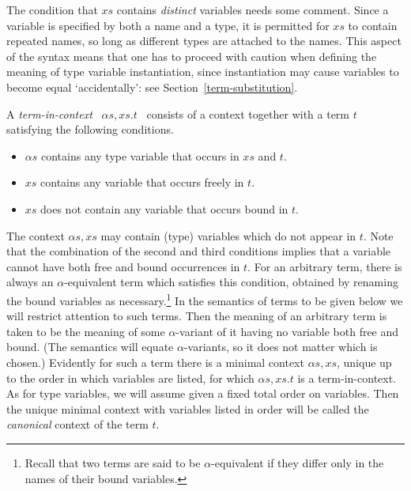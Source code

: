 The condition that $x\!s$ contains {\em distinct\/} variables needs
some comment. Since a variable is specified by both a name and a
type,  it is permitted for $x\!s$ to contain repeated
names,
 so long as different types are attached to the
names. This aspect of the syntax means that one has to proceed with
caution when defining the meaning of type variable instantiation,
since instantiation may cause variables to become equal
`accidentally': see Section~\ref{term-substitution}.

A {\em term-in-context\/}
$\:\;\alpha\!s,\!x\!s.t\;\:$ consists of a context together with a term
$t$ satisfying the following conditions.
\begin{itemize}

\item $\alpha\!s$ contains any type variable that occurs in $x\!s$ and $t$.

\item $x\!s$ contains any variable that occurs freely in $t$.

\item $x\!s$ does not contain any variable that occurs
bound in $t$.

\end{itemize}
The context $\alpha\!s,\!x\!s$ may contain (type) variables which do
not appear in $t$.  Note that the combination of the second and third
conditions implies that a variable cannot have both free and bound
occurrences in $t$. For an arbitrary term, there is always an
$\alpha$-equivalent term which satisfies this condition, obtained by
renaming the bound variables as necessary.\footnote{Recall that two
terms are said to be $\alpha$-equivalent if they differ only in the
names of their bound variables.} In the semantics of terms to be given
below we will restrict attention to such terms. Then the meaning of an
arbitrary term is taken to be the meaning of some $\alpha$-variant of
it having no variable both free and bound. (The semantics will equate
$\alpha$-variants, so it does not matter which is chosen.) Evidently
for such a term there is a minimal context $\alpha\!s,\!x\!s$, unique
up to the order in which variables are listed, for which
$\alpha\!s,\!x\!s.t$ is a term-in-context. As for type variables, we
will assume given a fixed total order on variables.  Then the unique
minimal context with variables listed in order will be called the {\em
canonical} context of the term $t$.


